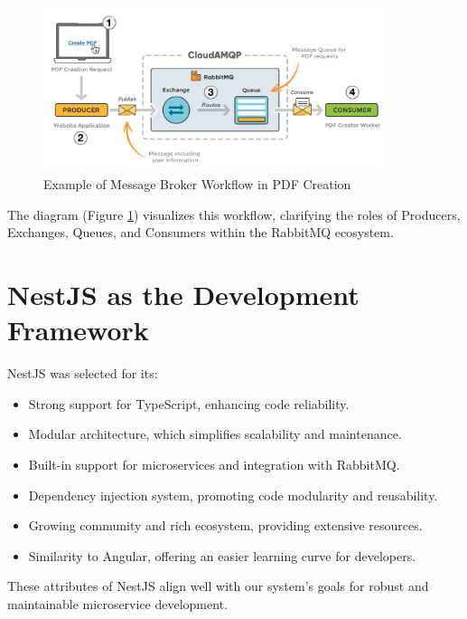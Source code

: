 \begin{figure}[H]
    \centering
    \includegraphics[width=0.9\textwidth]{src/assets/chapters/rabbitmqexample.png} %
    \caption{Example of Message Broker Workflow in PDF Creation}
    \label{fig:message_broker_workflow}
\end{figure}

The diagram (Figure \ref{fig:message_broker_workflow}) visualizes this workflow, clarifying the roles of Producers, Exchanges, Queues, and Consumers within the RabbitMQ ecosystem.

\section{NestJS as the Development Framework}

NestJS was selected for its:

\begin{itemize}
    \item Strong support for TypeScript, enhancing code reliability.
    \item Modular architecture, which simplifies scalability and maintenance.
    \item Built-in support for microservices and integration with RabbitMQ.
    \item Dependency injection system, promoting code modularity and reusability.
    \item Growing community and rich ecosystem, providing extensive resources.
    \item Similarity to Angular, offering an easier learning curve for developers.
\end{itemize}

These attributes of NestJS align well with our system’s goals for robust and maintainable microservice development.

